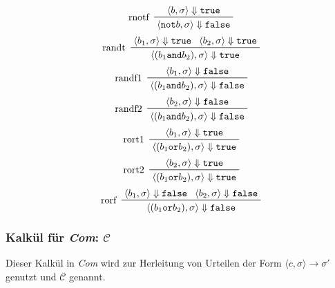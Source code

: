 \begin{multicols}{2}
\begin{equation*}
					    \prftree[l]
						    { rnotf }
						    { \langle b, \sigma \rangle \Downarrow \texttt{true} }
						    { \langle \texttt{not} b, \sigma \rangle \Downarrow \texttt{false} }
				    \end{equation*}
				    \begin{equation*}
					    \prftree[l]
						    { randt }
						    { \langle b _ 1, \sigma \rangle \Downarrow \texttt{true} }
						    { \langle b _ 2, \sigma \rangle \Downarrow \texttt{true} }
						    { \langle (b _ 1 \texttt{and} b _ 2), \sigma \rangle \Downarrow \texttt{true} }
				    \end{equation*}
				    \begin{equation*}
					    \prftree[l]
						    { randf1 }
						    { \langle b _ 1, \sigma \rangle \Downarrow \texttt{false} }
						    { \langle (b _ 1 \texttt{and} b _ 2), \sigma \rangle \Downarrow \texttt{false} }
				    \end{equation*}
				    \begin{equation*}
					    \prftree[l]
						    { randf2 }
						    { \langle b _ 2, \sigma \rangle \Downarrow \texttt{false} }
						    { \langle (b _ 1 \texttt{and} b _ 2), \sigma \rangle \Downarrow \texttt{false} }
				    \end{equation*}
				    \begin{equation*}
					    \prftree[l]
						    { rort1 }
						    { \langle b _ 1, \sigma \rangle \Downarrow \texttt{true} }
						    { \langle (b _ 1 \texttt{or} b _ 2), \sigma \rangle \Downarrow \texttt{true} }
				    \end{equation*}
				    \begin{equation*}
					    \prftree[l]
						    { rort2 }
						    { \langle b _ 2, \sigma \rangle \Downarrow \texttt{true} }
						    { \langle (b _ 1 \texttt{or} b _ 2), \sigma \rangle \Downarrow \texttt{true} }
				    \end{equation*}
				    \begin{equation*}
					    \prftree[l]
						    { rorf }
						    { \langle b _ 1, \sigma \rangle \Downarrow \texttt{false} }
						    { \langle b _ 2, \sigma \rangle \Downarrow \texttt{false} }
						    { \langle (b _ 1 \texttt{or} b _ 2), \sigma \rangle \Downarrow \texttt{false} }
				    \end{equation*}
			    \end{multicols}
		    
		    \subsubsection{Kalkül für \textit{Com}: $ \mathcal{C} $}
			    Dieser Kalkül in \textit{Com} wird zur Herleitung von Urteilen der Form $ \langle c, \sigma \rangle \rightarrow \sigma' $ genutzt und $ \mathcal{C} $ genannt.
		    

